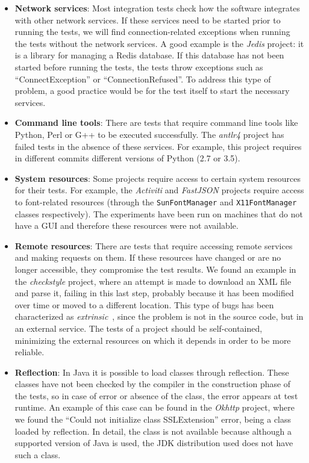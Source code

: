 \begin{itemize}
    \item \textbf{Network services}: 
    Most integration tests check how the software integrates with other network services. If these services need to be started prior to running the tests, we will find connection-related exceptions when running the tests without the network services.
    A good example is the \textit{Jedis} project: it is a library for managing a Redis database. 
    If this database has not been started before running the tests, the tests throw exceptions such as ``ConnectException'' or ``ConnectionRefused''.
    To address this type of problem, a good practice would be for the test itself to start the necessary services.
    \item \textbf{Command line tools}: 
    There are tests that require command line tools like Python, Perl or G++ to be executed successfully. 
    The \textit{antlr4} project has failed tests in the absence of these services. 
    For example, this project requires in different commits different versions of Python (2.7 or 3.5).
    \item \textbf{System resources}: 
    Some projects require access to certain system resources for their tests. 
    For example, the \textit{Activiti} and \textit{FastJSON} projects require access to font-related resources (through the \texttt{SunFontManager} and \texttt{X11FontManager} classes respectively). 
    The experiments have been run on machines that do not have a GUI and therefore these resources were not available.
    \item \textbf{Remote resources}: 
    There are tests that require accessing remote services and making requests on them. 
    If these resources have changed or are no longer accessible, they compromise the test results. 
    We found an example in the \textit{checkstyle} project, where an attempt is made to download an XML file and parse it, failing in this last step, probably because it has been modified over time or moved to a different location.
    This type of bugs has been characterized as \textit{extrinsic}~\cite{rodriguez2020bugs,rodriguezperez2020watch,rodriguez2018if}, since the problem is not in the source code, but in an external service.
    The tests of a project should be self-contained, minimizing the external resources on which it depends in order to be more reliable.
    \item \textbf{Reflection}: 
    In Java it is possible to load classes through reflection. 
    These classes have not been checked by the compiler in the construction phase of the tests, so in case of error or absence of the class, the error appears at test runtime. 
    An example of this case can be found in the \textit{Okhttp} project, where we found the ``Could not initialize class SSLExtension'' error, being a class loaded by reflection.
    In detail, the class is not available because although a supported version of Java is used, the JDK distribution used does not have such a class.
\end{itemize}

